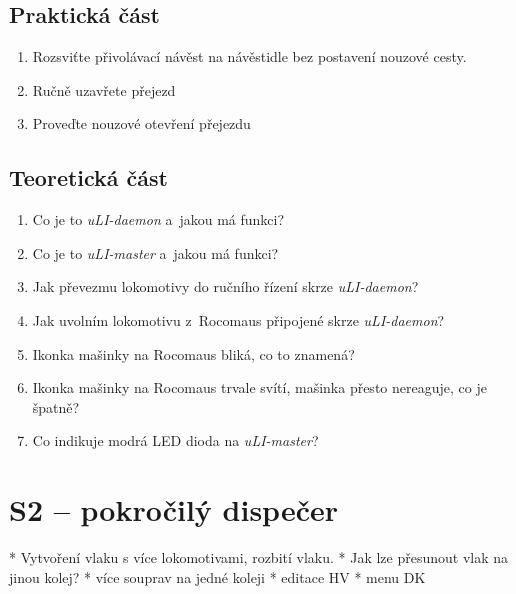 \documentclass[12pt,a4paper]{article}
\begin{document}
\subsection*{Praktická část}

\begin{enumerate}[leftmargin=*]
\item Rozsviťte přivolávací návěst na návěstidle bez postavení nouzové cesty.
\item Ručně uzavřete přejezd
\item Proveďte nouzové otevření přejezdu
\end{enumerate}

\subsection*{Teoretická část}

\begin{enumerate}[leftmargin=*]
\item Co je to \textit{uLI-daemon} a~jakou má funkci?
\item Co je to \textit{uLI-master} a~jakou má funkci?
\item Jak převezmu lokomotivy do ručního řízení skrze \textit{uLI-daemon}?
\item Jak uvolním lokomotivu z~Rocomaus připojené skrze \textit{uLI-daemon}?
\item Ikonka mašinky na Rocomaus bliká, co to znamená?
\item Ikonka mašinky na Rocomaus trvale svítí, mašinka přesto nereaguje, co je
špatně?
\item Co indikuje modrá LED dioda na \textit{uLI-master}?
\end{enumerate}


\newpage
\section*{S2 – pokročilý dispečer}

 * Vytvoření vlaku s více lokomotivami, rozbití vlaku.
 * Jak lze přesunout vlak na jinou kolej?
 * více souprav na jedné koleji
 * editace HV
 * menu DK
\end{document}
